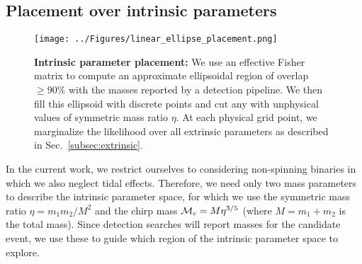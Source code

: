 
%


\subsection{Placement over intrinsic parameters}
\label{sec:itr_placement}

\begin{figure}
\texttt{[image: ../Figures/linear\_ellipse\_placement.png]}
\caption{\label{fig:linear_ellipse} \textbf{Intrinsic parameter placement:} We use an effective Fisher matrix to compute
an approximate ellipsoidal region of overlap $\geq 90\%$ with the masses reported by a detection pipeline.
We then fill this ellipsoid with discrete points and cut any with unphysical values of symmetric mass ratio $\eta$.
At each physical grid point, we marginalize the likelihood over all extrinsic parameters as described in
Sec.~\ref{subsec:extrinsic}.}
\end{figure}

In the current work, we restrict ourselves to considering non-spinning binaries in which we also neglect tidal
effects. Therefore, we need only two mass parameters to describe the intrinsic parameter space, for which we use
the symmetric mass ratio $\eta = m_1 m_2 / M^2$ 
and the chirp mass ${\cal M}_c = M \eta^{3/5}$ (where $M = m_1+m_2$ is the total mass).
Since detection searches will report masses for the candidate event, we use these
to guide which region of the intrinsic parameter space to explore.

